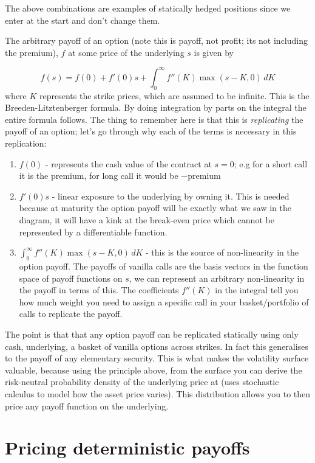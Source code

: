 \documentclass[9pt]{extarticle}
\begin{document}
The above combinations are examples of statically hedged positions since we enter at the start 
and don't change them. 


The arbitrary payoff of an option (note this is payoff, not profit; its not including the premium), $f$ at some price of the underlying $s$ is given by 

$$f(s) = f(0) + f'(0)s + \int_{0}^{\infty} f''(K) \operatorname{max}(s-K,0)\,dK$$
where $K$ represents the strike prices, which are assumed to be infinite. This is the Breeden-Litztenberger 
formula. By doing 
integration by parts on the integral the entire formula follows. The thing to remember here is that 
this is \textit{replicating} the payoff of an option; let's go through why each of the terms is necessary in this replication:
\begin{enumerate}
  \item $f(0)$ - represents the cash value of the contract at $s=0$; e.g for a short call it is the premium, for long call it would be $-$premium 
  \item $f'(0)s$ - linear exposure to the underlying by owning it. This is needed because at maturity the option payoff 
  will be exactly what we saw in the diagram, it will have a kink at the break-even price which cannot be represented by a differentiable function.
  \item $\int_{0}^{\infty} f''(K) \operatorname{max}(s-K,0)\,dK$ - this is the source of non-linearity in the option payoff. The payoffs of 
  vanilla calls are the basis vectors in the function space of payoff functions on $s$, we can represent an arbitrary non-linearity in the 
  payoff in terms of this. The coefficients $f''(K)$ in the integral tell you how much weight you need to assign 
  a specific call in your basket/portfolio of calls to replicate the payoff. 
\end{enumerate}
The point is that that 
any option payoff can be replicated statically using 
only cash, underlying, a basket of vanilla options across strikes. In fact 
this generalises to the payoff of any elementary security.
This is what makes the volatility surface valuable, because using the principle above, from the 
surface you can derive the risk-neutral
probability density of the underlying price at (uses stochastic calculus to model how 
the asset price varies). This 
distribution allows you to then price any payoff function on 
the underlying.

\section{Pricing deterministic payoffs}
\end{document}
